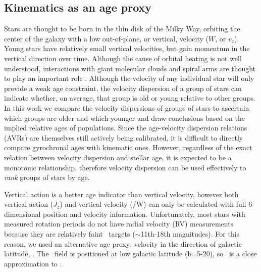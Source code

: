 \subsection{Kinematics as an age proxy}

Stars are thought to be born in the thin disk of the Milky Way, orbiting the
center of the galaxy with a low out-of-plane, or vertical, velocity ($W$, or
$v_z$).
Young stars have relatively small vertical velocities, but gain momentum in
the vertical direction over time.
Although the cause of orbital heating is not well understood, interactions
with giant molecular clouds and spiral arms are thought to play an important
role .
Although the velocity of any individual star will only provide a weak age
constraint, the velocity dispersion of a group of stars can indicate whether,
on average, that group is old or young relative to other groups.
In this work we compare the velocity dispersions of groups of stars to
ascertain which groups are older and which younger and draw conclusions based
on the implied relative ages of populations.
Since the age-velocity dispersion relations (AVRs) are themselves still
actively being calibrated, it is difficult to directly compare gyrochronal
ages with kinematic ones.
However, regardless of the exact relation between velocity dispersion and
stellar age, it is expected to be a monotonic relationship, therefore velocity
dispersion can be used effectively to {\it rank} groups of stars by age.

Vertical action is a better age indicator than vertical velocity, however both
vertical action ($J_z$) and vertical velocity (\vz/W) can only be calculated
with full 6-dimensional position and velocity information.
Unfortunately, most stars with measured rotation periods do not have radial
velocity (RV) measurements because they are relatively faint \kepler\ targets
($\sim$11th-18th magnitudes).
For this reason, we used an alternative age proxy: velocity in the direction
of galactic latitude, \vb.
The \kepler\ field is positioned at low galactic latitude (b=5-20\degrees), so
\vb\ is a close approximation to \vz.

